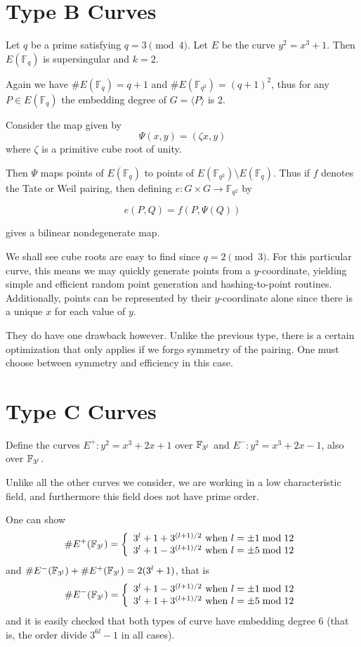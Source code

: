 \section {Type B Curves}

Let $q$ be a prime satisfying $q = 3 \pmod{4}$.
Let $E$ be the curve $y^2 = x^3 + 1$. Then
$E(\mathbb{F}_q)$ is supersingular and $k = 2$.

Again we have $\#E(\mathbb{F}_q) = q+1$ and $\#E(\mathbb{F}_{q^2}) = (q+1)^2$,
thus for any $P\in E(\mathbb{F}_q)$
the embedding degree of $G = \langle P \rangle$ is 2.

Consider the map given by
\[ \Psi(x, y) = (\zeta x, y) \]
where $\zeta$ is a primitive cube root of unity.

Then $\Psi$ maps points of $E(\mathbb{F}_q)$ to points of
$E(\mathbb{F}_{q^2}) \setminus E(\mathbb{F}_q)$. Thus if $f$ denotes the
Tate or Weil pairing, then defining $e:G \times G \rightarrow \mathbb{F}_{q^2}$
by

\[ e(P,Q) = f(P, \Psi(Q)) \]

gives a bilinear nondegenerate map.

We shall see cube roots are easy to find since $q = 2 \pmod{3}$.
For this particular curve, this means we may quickly generate points from
a $y$-coordinate, yielding simple and efficient random point generation and
hashing-to-point routines.
Additionally,
points can be represented by their $y$-coordinate alone since there is
a unique $x$ for each value of $y$.

They do have one drawback however. Unlike the previous type,
there is a certain optimization that
only applies if we forgo symmetry of the pairing. One must choose between
symmetry and efficiency in this case.

\section {Type C Curves}

Define the curves $E^{+} : y^2 = x^3 + 2 x + 1$ over $\mathbb{F}_{3^l}$
and $E^{-} : y^2 = x^3 + 2 x - 1$, also over $\mathbb{F}_{3^l}$.

Unlike all the other curves we consider,
we are working in a low characteristic field, and furthermore this
field does not have prime order.

One can show
\[
\#E^+(\mathbb{F}_{3^l}) = \left \{ \begin{array}{rcl}
3^l + 1 + 3^{(l+1)/2} \mbox { when } l = \pm 1 \bmod 12 \\
3^l + 1 - 3^{(l+1)/2} \mbox { when } l = \pm 5 \bmod 12
\end{array} \right.
\]
and $\#E^-(\mathbb{F}_{3^l}) + \#E^+(\mathbb{F}_{3^l}) = 2(3^l + 1)$, that is
\[
\#E^-(\mathbb{F}_{3^l}) = \left \{ \begin{array}{rcl}
3^l + 1 - 3^{(l+1)/2} \mbox { when } l = \pm 1 \bmod 12 \\
3^l + 1 + 3^{(l+1)/2} \mbox { when } l = \pm 5 \bmod 12
\end{array} \right.
\]
and it is easily checked that both types of curve have embedding
degree 6 (that is, the order divide $3^{6l} -1$ in all cases).

